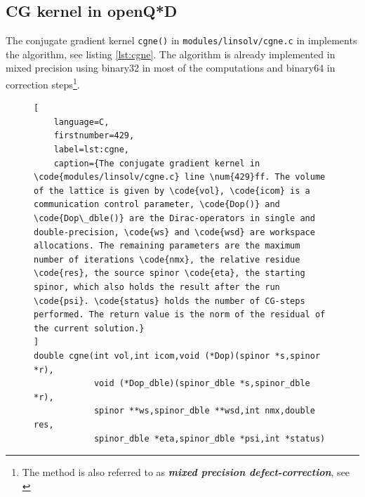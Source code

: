 \documentclass{article}
\theoremstyle{plain} %
\theoremstyle{convention} %
\theoremstyle{remark} %
\def\code#1{\texttt{#1}}
\def\df#1{\textbf{\textit{#1}}}
\numberwithin{equation}{section}
\begin{document}
\subsection{CG kernel in openQ*D}

\label{sec:fp_in_openqxd}

The conjugate gradient kernel \code{cgne()} in \code{modules/linsolv/cgne.c} in \cite{openqxd} implements the algorithm, see listing \ref{lst:cgne}. The algorithm is already implemented in mixed precision using \gls{binary32} in most of the computations and \gls{binary64} in correction steps\footnote{The method is also referred to as \df{mixed precision defect-correction}, see \cite{goddeke2005}}.

\begin{figure} %
\begin{lstlisting}[
    language=C,
    firstnumber=429,
    label=lst:cgne,
    caption={The conjugate gradient kernel in \code{modules/linsolv/cgne.c} line \num{429}ff. The volume of the lattice is given by \code{vol}, \code{icom} is a communication control parameter, \code{Dop()} and \code{Dop\_dble()} are the Dirac-operators in single and double-precision, \code{ws} and \code{wsd} are workspace allocations. The remaining parameters are the maximum number of iterations \code{nmx}, the relative residue \code{res}, the source spinor \code{eta}, the starting spinor, which also holds the result after the run \code{psi}. \code{status} holds the number of CG-steps performed. The return value is the norm of the residual of the current solution.}
]
double cgne(int vol,int icom,void (*Dop)(spinor *s,spinor *r),
            void (*Dop_dble)(spinor_dble *s,spinor_dble *r),
            spinor **ws,spinor_dble **wsd,int nmx,double res,
            spinor_dble *eta,spinor_dble *psi,int *status)
\end{lstlisting}
\end{figure} 
\end{document}
